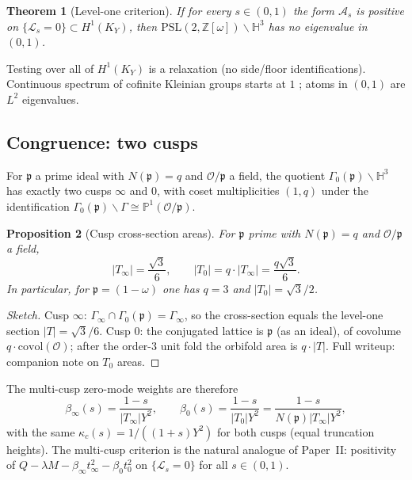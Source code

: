 \documentclass[11pt]{amsart}
\newtheorem{theorem}{Theorem}[section]
\newtheorem{proposition}[theorem]{Proposition}
\newcommand{\HH}{\mathbb{H}^3}
\newcommand{\ZZ}{\mathbb{Z}}
\newcommand{\PSL}{\mathrm{PSL}}
\newcommand{\p}{\mathfrak{p}}
\begin{document}
\begin{theorem}[Level-one criterion]\label{thm:critA}
If for every $s\in(0,1)$ the form $\mathcal{A}_s$ is positive on
$\{\mathcal{L}_s=0\}\subset H^1(K_Y)$, then
$\PSL(2,\ZZ[\omega])\backslash\HH$ has no eigenvalue in $(0,1)$.
\end{theorem}

Testing over all of $H^1(K_Y)$ is a relaxation (no side/floor
identifications).  Continuous spectrum of cofinite Kleinian groups starts
at $1$ \cite[Thm.~3.8.1]{Friedman}; atoms in $(0,1)$ are $L^2$
eigenvalues.

\subsection{Congruence: two cusps}

For $\p$ a prime ideal with $N(\p)=q$ and $\mathcal{O}/\p$ a field, the
quotient $\Gamma_0(\p)\backslash\HH$ has exactly two cusps $\infty$ and
$0$, with coset multiplicities $(1,q)$ under the identification
$\Gamma_0(\p)\backslash\Gamma\cong\mathbb{P}^1(\mathcal{O}/\p)$.

\begin{proposition}[Cusp cross-section areas]\label{prop:T0}
For $\p$ prime with $N(\p)=q$ and $\mathcal{O}/\p$ a field,
\[
  |T_\infty|=\frac{\sqrt{3}}{6},\qquad
  |T_0|=q\cdot|T_\infty|=\frac{q\sqrt{3}}{6}.
\]
In particular, for $\p=(1-\omega)$ one has $q=3$ and $|T_0|=\sqrt{3}/2$.
\end{proposition}

\begin{proof}[Sketch]
Cusp $\infty$: $\Gamma_\infty\cap\Gamma_0(\p)=\Gamma_\infty$, so the
cross-section equals the level-one section $|T|=\sqrt{3}/6$.  Cusp $0$:
the conjugated lattice is $\p$ (as an ideal), of covolume
$q\cdot\mathrm{covol}(\mathcal{O})$; after the order-$3$ unit fold the
orbifold area is $q\cdot|T|$.  Full writeup: companion note on $T_0$ areas.
\end{proof}

The multi-cusp zero-mode weights are therefore
\begin{equation}\label{eq:beta2}
  \beta_\infty(s)=\frac{1-s}{|T_\infty|Y^2},\qquad
  \beta_0(s)=\frac{1-s}{|T_0|Y^2}
  =\frac{1-s}{N(\p)|T_\infty|Y^2},
\end{equation}
with the same $\kappa_c(s)=1/((1+s)Y^2)$ for both cusps (equal truncation
heights).  The multi-cusp criterion is the natural analogue of Paper~II:
positivity of
$Q-\lambda M-\beta_\infty t_\infty^2-\beta_0 t_0^2$ on
$\{\mathcal{L}_s=0\}$ for all $s\in(0,1)$.
\end{document}
